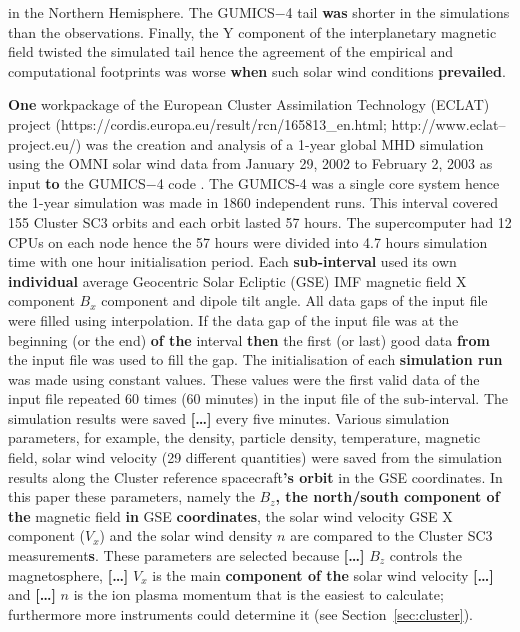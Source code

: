 \documentclass[linenumbers,draft]{agujournal}
\begin{document}
in the Northern Hemisphere. The GUMICS$-$4 tail \textbf{was} shorter in the simulations than the observations. Finally, the Y component of the interplanetary magnetic field twisted the simulated tail hence the agreement of the empirical and computational footprints was worse \textbf{when} such solar wind conditions \textbf{prevailed}.

\textbf{One} workpackage of the European Cluster Assimilation Technology (ECLAT) project (https://cordis.europa.eu/result/rcn/165813\_en.html; http://www.eclat--project.eu/) was the creation and analysis of a 1-year global MHD simulation using the OMNI solar wind data  from January 29, 2002 to February 2, 2003 as input \textbf{to} the GUMICS$-$4 code \citep{facsko16:_one_earth}. The GUMICS-4 was a single core system \citep{janhunen12:_gumic_mhd} hence the 1-year simulation was made in 1860 independent runs. This interval covered 155 Cluster SC3 orbits and each orbit lasted 57 hours. The supercomputer had 12 CPUs on each node hence the 57 hours were divided into 4.7 hours simulation time with one hour initialisation period. Each \textbf{sub-interval} used its own \textbf{individual} average Geocentric Solar Ecliptic (GSE) IMF magnetic field X component $B_x$ component and dipole tilt angle. All data gaps of the input file were filled using interpolation. If the data gap of the input file was at the beginning (or the end) \textbf{of the} interval \textbf{then} the first (or last) good data \textbf{from} the input file was used to fill the gap. The initialisation of each \textbf{simulation run} was made using constant values. These values were the first valid data of the input file repeated 60 times (60 minutes) in the input file of the sub-interval. The simulation results were saved \textbf{[\dots]} every five minutes. Various simulation parameters, for example, the density, particle density, temperature, magnetic field, solar wind velocity (29 different quantities) were saved from the simulation results along the Cluster reference spacecraft\textbf{'s orbit} in the GSE coordinates. In this paper these parameters, namely the $B_z$\textbf{, the north/south component of the} magnetic field \textbf{in} GSE \textbf{coordinates}, the solar wind velocity GSE X component ($V_x$) and the solar wind density $n$ are compared to the Cluster SC3 measurement\textbf{s}. These parameters are selected because \textbf{[\dots]} $B_z$ controls the magnetosphere, \textbf{[\dots]} $V_x$ is the main \textbf{component of the} solar wind velocity \textbf{[\dots]} and \textbf{[\dots]} $n$ is the ion plasma momentum that is the easiest to calculate; furthermore more instruments could determine it (see Section~\ref{sec:cluster}).
\end{document}
